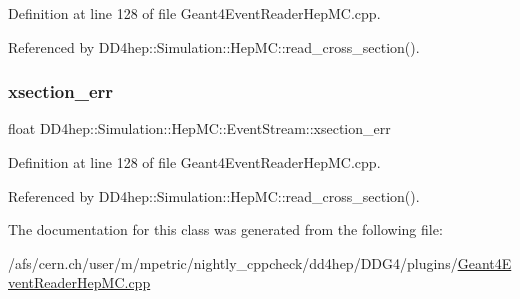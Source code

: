 Definition at line 128 of file Geant4\+Event\+Reader\+Hep\+M\+C.\+cpp.



Referenced by D\+D4hep\+::\+Simulation\+::\+Hep\+M\+C\+::read\+\_\+cross\+\_\+section().

\hypertarget{class_d_d4hep_1_1_simulation_1_1_hep_m_c_1_1_event_stream_ab2ad757474584ec785c50c36181b2ae2}{}\label{class_d_d4hep_1_1_simulation_1_1_hep_m_c_1_1_event_stream_ab2ad757474584ec785c50c36181b2ae2} 
\subsubsection{\texorpdfstring{xsection\+\_\+err}{xsection\_err}}
{\footnotesize\ttfamily float D\+D4hep\+::\+Simulation\+::\+Hep\+M\+C\+::\+Event\+Stream\+::xsection\+\_\+err}



Definition at line 128 of file Geant4\+Event\+Reader\+Hep\+M\+C.\+cpp.



Referenced by D\+D4hep\+::\+Simulation\+::\+Hep\+M\+C\+::read\+\_\+cross\+\_\+section().



The documentation for this class was generated from the following file\+:\begin{DoxyCompactItemize}
\item 
/afs/cern.\+ch/user/m/mpetric/nightly\+\_\+cppcheck/dd4hep/\+D\+D\+G4/plugins/\hyperlink{_geant4_event_reader_hep_m_c_8cpp}{Geant4\+Event\+Reader\+Hep\+M\+C.\+cpp}\end{DoxyCompactItemize}
